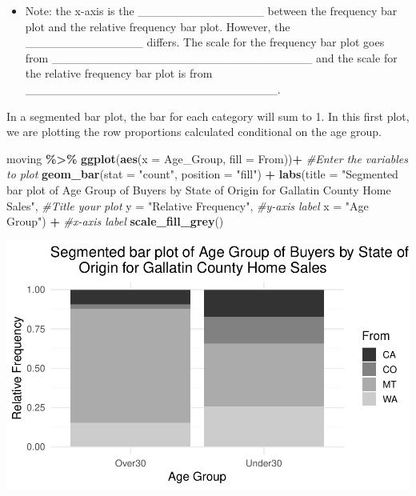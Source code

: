\documentclass[
]{report}
\newenvironment{Shaded}{\begin{snugshade}}{\end{snugshade}}
\newcommand{\AttributeTok}[1]{\textcolor[rgb]{0.13,0.29,0.53}{#1}}
\newcommand{\CommentTok}[1]{\textcolor[rgb]{0.56,0.35,0.01}{\textit{#1}}}
\newcommand{\FunctionTok}[1]{\textcolor[rgb]{0.13,0.29,0.53}{\textbf{#1}}}
\newcommand{\NormalTok}[1]{#1}
\newcommand{\SpecialCharTok}[1]{\textcolor[rgb]{0.81,0.36,0.00}{\textbf{#1}}}
\newcommand{\StringTok}[1]{\textcolor[rgb]{0.31,0.60,0.02}{#1}}
\providecommand{\tightlist}{%
  \setlength{\itemsep}{0pt}\setlength{\parskip}{0pt}}
\begin{document}

\begin{itemize}
\tightlist
\item
  Note: the x-axis is the \_\_\_\_\_\_\_\_\_\_\_\_\_\_\_ between the frequency bar plot and the relative frequency bar plot. However, the \_\_\_\_\_\_\_\_\_\_\_\_\_\_ differs. The scale for the frequency bar plot goes from \_\_\_\_\_\_\_\_\_\_\_\_\_\_\_\_\_\_\_\_\_\_\_\_\_\_\_\_\_\_\_ and the scale for the relative frequency bar plot is from \_\_\_\_\_\_\_\_\_\_\_\_\_\_\_\_\_\_\_\_\_\_\_\_\_\_\_\_\_\_.
\end{itemize}


\newpage

In a segmented bar plot, the bar for each category will sum to 1. In this first plot, we are plotting the row proportions calculated conditional on the age group.

\begin{Shaded}
\begin{Highlighting}[]
\NormalTok{moving }\SpecialCharTok{\%\textgreater{}\%}
  \FunctionTok{ggplot}\NormalTok{(}\FunctionTok{aes}\NormalTok{(}\AttributeTok{x =}\NormalTok{ Age\_Group, }\AttributeTok{fill =}\NormalTok{ From))}\SpecialCharTok{+} \CommentTok{\#Enter the variables to plot}
  \FunctionTok{geom\_bar}\NormalTok{(}\AttributeTok{stat =} \StringTok{"count"}\NormalTok{, }\AttributeTok{position =} \StringTok{"fill"}\NormalTok{) }\SpecialCharTok{+}
  \FunctionTok{labs}\NormalTok{(}\AttributeTok{title =} \StringTok{"Segmented bar plot of Age Group of Buyers by State of }
\StringTok{       Origin for Gallatin County Home Sales"}\NormalTok{, }
       \CommentTok{\#Title your plot}
       \AttributeTok{y =} \StringTok{"Relative Frequency"}\NormalTok{, }\CommentTok{\#y{-}axis label}
       \AttributeTok{x =} \StringTok{"Age Group"}\NormalTok{) }\SpecialCharTok{+} \CommentTok{\#x{-}axis label}
  \FunctionTok{scale\_fill\_grey}\NormalTok{()}
\end{Highlighting}
\end{Shaded}

\begin{center}\includegraphics[width=0.55\linewidth]{03-LN03-EDA_files/figure-latex/unnamed-chunk-8-1} \end{center}
\end{document}
